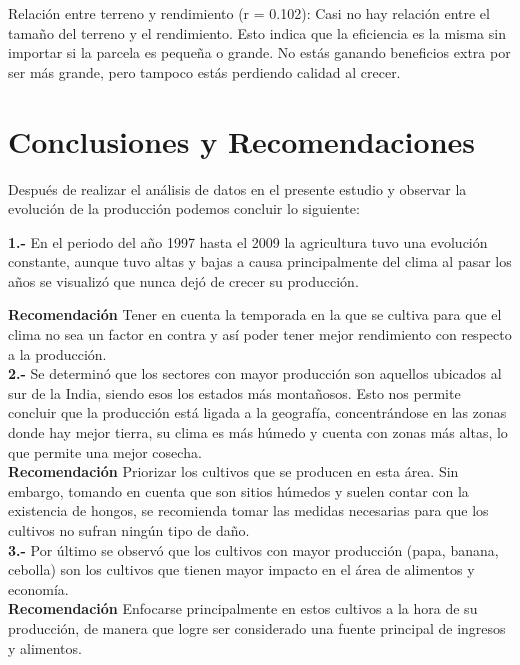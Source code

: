 \documentclass[oneside,11pt]{Latex/Classes/PhDthesisPSnPDF}
\begin{document}
Relación entre terreno y rendimiento (r = 0.102): Casi no hay relación
entre el tamaño del terreno y el rendimiento. Esto indica que la
eficiencia es la misma sin importar si la parcela es pequeña o grande.
No estás ganando beneficios extra por ser más grande, pero tampoco estás
perdiendo calidad al crecer.

\chapter{Conclusiones y Recomendaciones}

Después de realizar el análisis de datos en el presente estudio y
observar la evolución de la producción podemos concluir lo siguiente:

\textbf{1.-} En el periodo del año 1997 hasta el 2009 la agricultura
tuvo una evolución constante, aunque tuvo altas y bajas a causa
principalmente del clima al pasar los años se visualizó que nunca dejó
de crecer su producción.~

\textbf{Recomendación} Tener en cuenta la temporada en la que se cultiva
para que el clima no sea un factor en contra y así poder tener mejor
rendimiento con respecto a la producción.\\

\textbf{2.-} Se determinó que los sectores con mayor producción son
aquellos ubicados al sur de la India, siendo esos los estados más
montañosos. Esto nos permite concluir que la producción está ligada a la
geografía, concentrándose en las zonas donde hay mejor tierra, su clima
es más húmedo y cuenta con zonas más altas, lo que permite una mejor
cosecha.\\

\textbf{Recomendación} Priorizar los cultivos que se producen en esta
área. Sin embargo, tomando en cuenta que son sitios húmedos y suelen
contar con la existencia de hongos, se recomienda tomar las medidas
necesarias para que los cultivos no sufran ningún tipo de daño.\\

\textbf{3.-} Por último se observó que los cultivos con mayor producción
(papa, banana, cebolla) son los cultivos que tienen mayor impacto en el
área de alimentos y economía.\\

\textbf{Recomendación} Enfocarse principalmente en estos cultivos a la
hora de su producción, de manera que logre ser considerado una fuente
principal de ingresos y alimentos.\\
\end{document}
